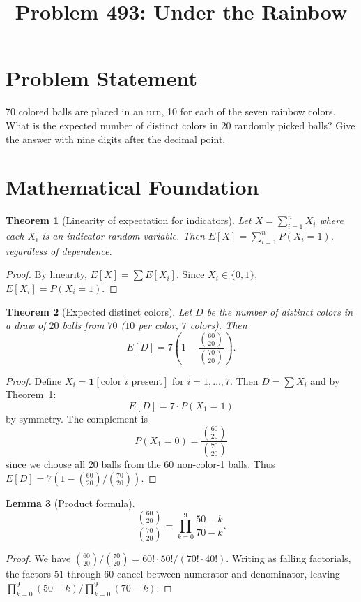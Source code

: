 \documentclass[12pt]{article}
\title{Problem 493: Under the Rainbow}
\author{}
\date{}
\newtheorem{theorem}{Theorem}
\newtheorem{lemma}[theorem]{Lemma}
\begin{document}
\maketitle

\section{Problem Statement}
70 colored balls are placed in an urn, 10 for each of the seven rainbow colors. What is the expected number of distinct colors in 20 randomly picked balls? Give the answer with nine digits after the decimal point.

\section{Mathematical Foundation}

\begin{theorem}[Linearity of expectation for indicators]
Let $X = \sum_{i=1}^{n} X_i$ where each $X_i$ is an indicator random variable. Then $E[X] = \sum_{i=1}^{n} P(X_i = 1)$, regardless of dependence.
\end{theorem}

\begin{proof}
By linearity, $E[X] = \sum E[X_i]$. Since $X_i \in \{0,1\}$, $E[X_i] = P(X_i = 1)$.
\end{proof}

\begin{theorem}[Expected distinct colors]
Let $D$ be the number of distinct colors in a draw of $20$ balls from $70$ ($10$ per color, $7$ colors). Then
\[
E[D] = 7\!\left(1 - \frac{\binom{60}{20}}{\binom{70}{20}}\right).
\]
\end{theorem}

\begin{proof}
Define $X_i = \mathbf{1}[\text{color } i \text{ present}]$ for $i = 1, \ldots, 7$. Then $D = \sum X_i$ and by Theorem~1:
\[
E[D] = 7 \cdot P(X_1 = 1)
\]
by symmetry. The complement is
\[
P(X_1 = 0) = \frac{\binom{60}{20}}{\binom{70}{20}}
\]
since we choose all $20$ balls from the $60$ non-color-1 balls. Thus $E[D] = 7(1 - \binom{60}{20}/\binom{70}{20})$.
\end{proof}

\begin{lemma}[Product formula]
\[
\frac{\binom{60}{20}}{\binom{70}{20}} = \prod_{k=0}^{9}\frac{50-k}{70-k}.
\]
\end{lemma}

\begin{proof}
We have $\binom{60}{20}/\binom{70}{20} = 60!\cdot 50!/(70!\cdot 40!)$. Writing as falling factorials, the factors $51$ through $60$ cancel between numerator and denominator, leaving $\prod_{k=0}^{9}(50-k)/\prod_{k=0}^{9}(70-k)$.
\end{proof}
\end{document}
